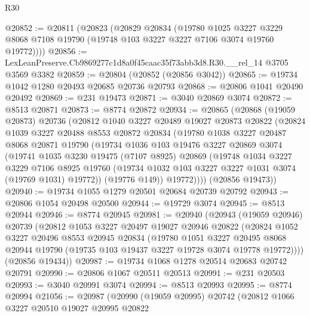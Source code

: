 \begin{lexlean}{R30}
\begin{coremodule}
@20852 := @20811
    (@20823
      (@20829
        @20834
        (@19780
          @1025
          @3227
          @3229
          @8068
          @7108
          @19790
          (@19748 @103 @3227 @3227 @7106 @3074 @19760 @19772))))
@20856 := LexLeanPreserve.Cb9869277c1d8a0f45caac35f73abb3d8.R30.__rel_14 @3705 @3569 @3382
@20859 := @20804 (@20852 (@20856 @3042))
@20865 := @19734 @1042 @1280 @20493 @20685 @20736 @20793
@20868 := @20806 @1041 @20490 @20492
@20869 := @231 @19473
@20871 := @3040 @20869 @3074
@20872 := @8513 @20871
@20873 := @8774 @20872
@20934 := @20865
    (@20868
      (@19059 @20873)
      @20736
      (@20812
        @1040
        @3227
        @20489
        @19027
        @20873
        @20822
        (@20824
          @1039
          @3227
          @20488
          @8553
          @20872
          @20834
          (@19780
            @1038
            @3227
            @20487
            @8068
            @20871
            @19790
            (@19734
              @1036
              @103
              @19476
              @3227
              @20869
              @3074
              (@19741
                @1035
                @3230
                @19475
                (@7107 @8925)
                @20869
                (@19748
                  @1034
                  @3227
                  @3229
                  @7106
                  @8925
                  @19760
                  (@19734 @1032 @103 @3227 @3227 @1031 @3074 (@19769 @1031) @19772))
                (@19776 @149))
              @19772))))
      (@20856 @19473))
@20940 := @19734 @1055 @1279 @20501 @20684 @20739 @20792
@20943 := @20806 @1054 @20498 @20500
@20944 := @19729 @3074
@20945 := @8513 @20944
@20946 := @8774 @20945
@20981 := @20940
    (@20943
      (@19059 @20946)
      @20739
      (@20812
        @1053
        @3227
        @20497
        @19027
        @20946
        @20822
        (@20824
          @1052
          @3227
          @20496
          @8553
          @20945
          @20834
          (@19780
            @1051
            @3227
            @20495
            @8068
            @20944
            @19790
            (@19735 @103 @19437 @3227 @19728 @3074 @19778 @19772))))
      (@20856 @19434))
@20987 := @19734 @1068 @1278 @20514 @20683 @20742 @20791
@20990 := @20806 @1067 @20511 @20513
@20991 := @231 @20503
@20993 := @3040 @20991 @3074
@20994 := @8513 @20993
@20995 := @8774 @20994
@21056 := @20987
    (@20990
      (@19059 @20995)
      @20742
      (@20812
        @1066
        @3227
        @20510
        @19027
        @20995
        @20822

\end{coremodule}
\end{lexlean}
